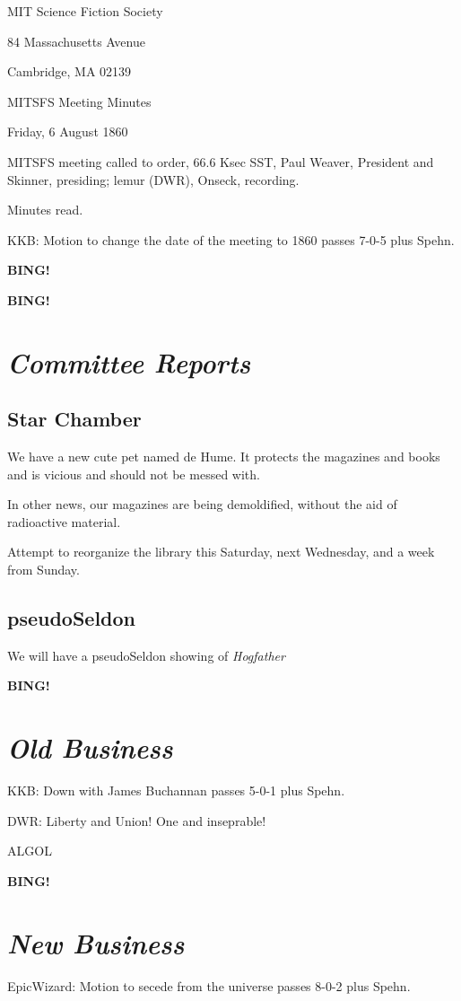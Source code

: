 \documentclass[10pt]{article}
\newcommand{\bing}{{\bf BING!} }
\newcommand{\goto}[1]{\bing \vskip 12pt \section*{{\em{#1}}}}
\newcommand{\ps}{ plus Spehn\xspace}
\newcommand{\skinner}{Paul Weaver, President and Skinner}
\newcommand{\onseck}{lemur (DWR), Onseck}
\newcommand{\meetingdate}{Friday, 6 August 1860}
\begin{document}
\begin{center}

MIT Science Fiction Society

84 Massachusetts Avenue

Cambridge, MA 02139

\vspace{12pt}

MITSFS Meeting Minutes

\meetingdate

\end{center}

\vspace{18pt}

\setlength{\parskip}{6pt}

\noindent
MITSFS meeting called to order, 66.6 Ksec SST,
\skinner, presiding; \onseck, recording.

Minutes read.

KKB: Motion to change the date of the meeting to 1860 passes 7-0-5\ps.

\bing

\goto{Committee Reports}

\subsection*{Star Chamber}

We have a new cute pet named de Hume.  It protects the magazines and
books and is vicious and should not be messed with.

In other news, our magazines are being demoldified, without the aid
of radioactive material.

Attempt to reorganize the library this Saturday, next Wednesday, and a
week from Sunday.

\subsection*{pseudoSeldon}

We will have a pseudoSeldon showing of \emph{Hogfather}

\goto{Old Business}

KKB: Down with James Buchannan passes 5-0-1\ps.

DWR: Liberty and Union!  One and inseprable!

ALGOL

\goto{New Business}

EpicWizard: Motion to secede from the universe passes 8-0-2\ps.
\end{document}
